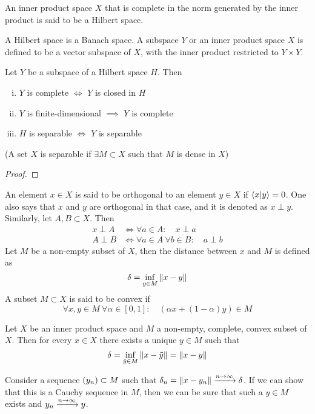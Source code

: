 \documentclass[../../script.tex]{subfiles}
\begin{document}
    \begin{defi}
        An inner product space $X$ that is complete in the norm generated by the inner product is said to be a Hilbert space.

        A Hilbert space is a Banach space. A subspace $Y$ or an inner product space $X$ is defined to be a vector subspace  of $X$, with the inner product restricted to $Y \times Y$.
    \end{defi}

    \begin{thm}
        Let $Y$ be a subspace of a Hilbert space $H$. Then 
        \begin{enumerate}[(i)]
            \item $Y$ is complete $\iff$ $Y$ is closed in $H$ 
            \item $Y$ is finite-dimensional $\implies$ $Y$ is complete 
            \item $H$ is separable $\iff$ $Y$ is separable
        \end{enumerate}
        (A set $X$ is separable if $\exists M \subset X$ such that $M$ is dense in $X$)
    \end{thm}
    \begin{proof}
        \noproof
    \end{proof}

    \begin{defi}
        An element $x \in X$ is said to be orthogonal to an element $y \in X$ if $\innerproduct{x}{y} = 0$. One also says that $x$ and $y$ are orthogonal in that case, and it is denoted as $x \perp y$.
        Similarly, let $A, B \subset X$. Then
        \begin{align*}
            x \perp A &\iff \forall a \in A: \quad x \perp a \\
            A \perp B &\iff \forall a \in A ~\forall b \in B: \quad a \perp b
        \end{align*}
        Let $M$ be a non-empty subset of $X$, then the distance between $x$ and $M$ is defined as 
        \[
            \delta = \inf_{y \in M} \norm{x - y}
        \] 
        A subset $M \subset X$ is said to be convex if 
        \[
            \forall x, y \in M ~\forall \alpha \in [0, 1]: \quad (\alpha x + (1 - \alpha) y) \in M
        \]
    \end{defi}

    \begin{thm}\label{thm:17.11}
        Let $X$ be an inner product space and $M$ a non-empty, complete, convex subset of $X$. Then for every $x \in X$ there exists a unique $y \in M$ such that 
        \[
            \delta = \inf_{\tilde{y} \in M} \norm{x - \tilde{y}} = \norm{x - y}
        \]
    \end{thm}
    \begin{hproof}
        Consider a sequence $\anyseqdef[y]{M}$ such that $\delta_n = \norm{x - y_n} \conv{n \rightarrow \infty} \delta$.
        If we can show that this is a Cauchy sequence in $M$, then we can be sure that such a $y \in M$ exists and $y_n \conv{n \rightarrow \infty} y$.
    \end{hproof}
\end{document}

